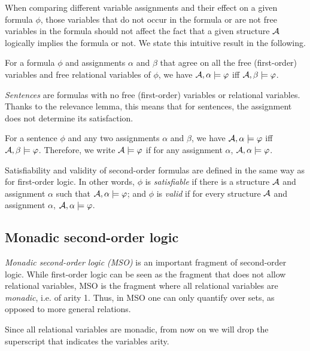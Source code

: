 \documentclass[11pt,twoside=off,numbers=noenddot]{scrbook}
\begin{document}
When comparing different variable assignments and their effect on a given formula $\phi$, those variables that do not occur in the formula or are not free variables in the formula should not affect the fact that a given structure $\mathcal{A}$ logically implies the formula or not. We state this intuitive result in the following.

\begin{lemma}
  For a formula $\phi$ and assignments $\alpha$ and $\beta$ that agree on all the free (first-order) variables and free relational variables of $\phi$, we have $\mathcal{A}, \alpha \models \varphi$ iff $\mathcal{A}, \beta \models \varphi$.
\end{lemma}

\emph{Sentences} are formulas with no free (first-order) variables or relational variables. Thanks to the relevance lemma, this means that for sentences, the assignment does not determine its satisfaction.

\begin{proposition}
  For a sentence $\phi$ and any two assignments $\alpha$ and $\beta$, we have $\mathcal{A}, \alpha \models \varphi$ iff $\mathcal{A}, \beta \models \varphi$. Therefore, we write $\mathcal{A} \models \varphi$ if for any assignment $\alpha$, $\mathcal{A}, \alpha \models \varphi$.
\end{proposition}

Satisfiability and validity of second-order formulas are defined in the same way as for first-order logic. In other words, $\phi$ is \emph{satisfiable} if there is a structure $\mathcal{A}$ and assignment $\alpha$ such that $\mathcal{A}, \alpha \models \varphi$; and $\phi$ is \emph{valid} if for every structure $\mathcal{A}$ and assignment $\alpha$, $\mathcal{A}, \alpha \models \varphi$.

\subsection{Monadic second-order logic}
\emph{Monadic second-order logic (MSO)} is an important fragment of second-order logic. While first-order logic can be seen as the fragment that does not allow relational variables, MSO is the fragment where all relational variables are \emph{monadic}, i.e. of arity 1. Thus, in MSO one can only quantify over sets, as opposed to more general relations.

\begin{abuse}
  Since all relational variables are monadic, from now on we will drop the superscript that indicates the variables arity.
\end{abuse}
\end{document}
